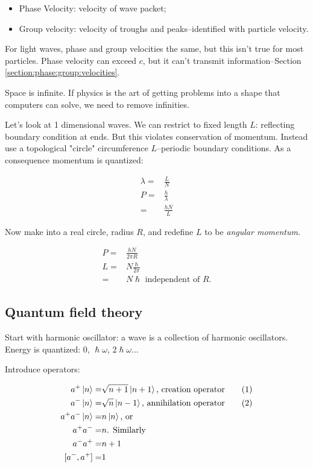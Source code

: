 \documentclass[]{article}
\newcommand\numberthis{\addtocounter{equation}{1}\tag{\theequation}}
\begin{document}
\begin{itemize}
	\item Phase Velocity: velocity of wave packet;
	\item Group velocity: velocity of troughs and peaks--identified with particle velocity.
\end{itemize}

For light waves, phase and group velocities the same, but this isn't true for most particles. Phase velocity can exceed $c$, but it can't transmit information--Section \ref{section:phase:group:velocities}.

Space is infinite. If physics is the art of getting problems into a shape that computers can solve, we need to remove infinities.

Let's look at 1 dimensional waves. We can restrict to fixed length $L$: reflecting boundary condition at ends. But this violates conservation of momentum. Instead use a topological "circle" circumference $L$--periodic boundary conditions. As a consequence momentum is quantized: 

\begin{align*}
\lambda =& \frac{L}{N}\\
P =& \frac{h}{\lambda}\\
=& \frac{h N}{L}
\end{align*}

Now make into a real circle, radius $R$, and redefine $L$ to be \emph{angular momentum}.

\begin{align*}
P =& \frac{h N}{2 \pi R}\\
L =& N \frac{h}{2 \pi}\\
=& N \hslash \text{ independent of $R$.}
\end{align*}

\subsection{Quantum field theory}

Start with harmonic oscillator: a wave is a collection of harmonic oscillators. Energy is quantized: 0, $\hslash \omega$, $2\hslash \omega$...

Introduce operators:

\begin{align*}
a^+ \ket{n} =& \sqrt{n+1} \ket{n+1} \text{, creation operator} \numberthis \label{eq:creation}\\
a^- \ket{n} =& \sqrt{n} \ket{n-1} \text{, annihilation operator} \numberthis \label{eq:annihilation} \\
a^+ a^- \ket{n} =& n \ket{n} \text{, or}\\
a^+ a^-  =& n \text{. Similarly}\\
a^- a^+  =& n+1\\
[a^-, a^+] =& 1
\end{align*}
\end{document}
